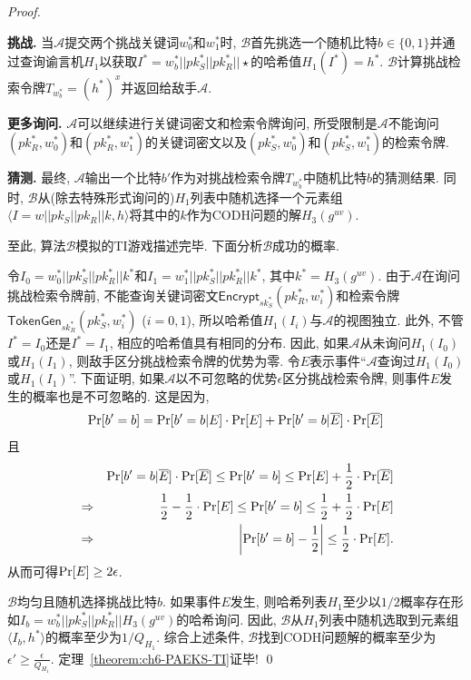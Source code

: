 \begin{proof}
\begin{trivlist}
\item \textbf{挑战.} 当$\mathcal{A}$提交两个挑战关键词$w_0^*$和$w_1^*$时, $\mathcal{B}$首先挑选一个随机比特$b \in \{0, 1\}$并通过查询谕言机$H_1$以获取$I^* = w_b^*||pk_S^*||pk_R^*||\star$的哈希值$H_1(I^*) = h^*$. $\mathcal{B}$计算挑战检索令牌$T_{w_b^*} = (h^*)^x$并返回给敌手$\mathcal{A}$.

\item \textbf{更多询问.} $\mathcal{A}$可以继续进行关键词密文和检索令牌询问, 所受限制是$\mathcal{A}$不能询问$(pk_R^*, w_0^*)$和$(pk_R^*, w_1^*)$的关键词密文以及$(pk_S^*, w_0^*)$和$(pk_S^*, w_1^*)$的检索令牌.

\item \textbf{猜测.} 最终, $\mathcal{A}$输出一个比特$b'$作为对挑战检索令牌$T_{w_b^*}$中随机比特$b$的猜测结果. 同时, $\mathcal{B}$从(除去特殊形式询问的)$H_1$列表中随机选择一个元素组$\langle I = w||pk_S||pk_R||k, h\rangle$将其中的$k$作为CODH问题的解$H_3(g^{uv})$. 
\end{trivlist}

至此, 算法$\mathcal{B}$模拟的TI游戏描述完毕. 下面分析$\mathcal{B}$成功的概率.

令$I_0 = w_0^*||pk_S^*||pk_R^*||k^*$和$I_1 = w_1^*||pk_S^*||pk_R^*||k^*$, 其中$k^* = H_3(g^{uv})$. 由于$\mathcal{A}$在询问挑战检索令牌前, 不能查询关键词密文$\mathsf{Encrypt}_{sk_S^*}(pk_R^*, w_i^*)$和检索令牌$\mathsf{TokenGen}_{sk_R^*}(pk_S^*, w_i^*)$ ($i = 0, 1$), 所以哈希值$H_1(I_i)$与$\mathcal{A}$的视图独立. 此外, 不管$I^* = I_0$还是$I^*=I_1$, 相应的哈希值具有相同的分布. 因此, 如果$\mathcal{A}$从未询问$H_1(I_0)$或$H_1(I_1)$, 则敌手区分挑战检索令牌的优势为零. 令$E$表示事件``$\mathcal{A}$查询过$H_1(I_0)$或$H_1(I_1)$''. 下面证明, 如果$\mathcal{A}$以不可忽略的优势$\epsilon$区分挑战检索令牌, 则事件$E$发生的概率也是不可忽略的. 这是因为,
\[
\textup{Pr}[b' = b] = \textup{Pr}[b' = b | E] \cdot \textup{Pr}[E] + \textup{Pr}[b' = b | \overline{E}] \cdot \textup{Pr}[\overline{E}]
\]
且
\begin{eqnarray*}
&&\textup{Pr}[b' = b|\overline{E}] \cdot \textup{Pr}[\overline{E}] \leq \textup{Pr}[b' = b] \leq \textup{Pr}[E] + \frac{1}{2} \cdot \textup{Pr}[\overline{E}]\\
&\Rightarrow & \frac{1}{2} - \frac{1}{2} \cdot \textup{Pr}[E] \leq \textup{Pr}[b' = b] \leq \frac{1}{2} + \frac{1}{2} \cdot \textup{Pr}[E]\\
&\Rightarrow &\left|\textup{Pr}[b' = b] - \frac{1}{2}\right| \leq \frac{1}{2} \cdot \textup{Pr}[E].
\end{eqnarray*} 
从而可得$\textup{Pr}[E] \geq 2\epsilon$.

$\mathcal{B}$均匀且随机选择挑战比特$b$. 如果事件$E$发生, 则哈希列表$H_1$至少以$1/2$概率存在形如$I_b = w_b^*||pk_S^*||pk_R^*||H_3(g^{uv})$的哈希询问. 因此, $\mathcal{B}$从$H_1$列表中随机选取到元素组$\langle I_b, h^*\rangle$的概率至少为$1/Q_{H_1}$. 综合上述条件, $\mathcal{B}$找到CODH问题解的概率至少为$\epsilon' \geq \frac{\epsilon}{Q_{H_1}}$. 定理~\ref{theorem:ch6-PAEKS-TI}证毕! \qed
\end{proof}

